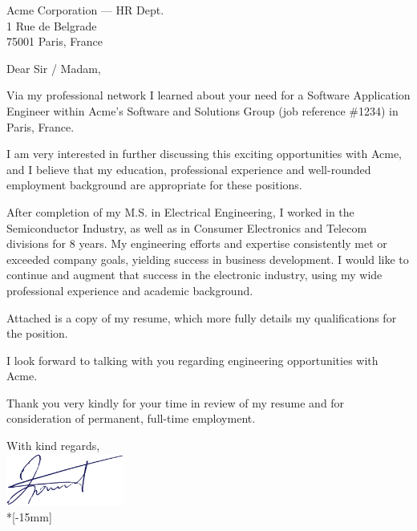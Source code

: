 \documentclass[standard]{scrlttr2}
\begin{document}
\begin{letter}{
   Acme Corporation --- HR Dept.\\
   1 Rue de Belgrade \\
   75001 Paris, France \\
}


\opening{Dear Sir / Madam,}
Via my professional network I learned about your need for a Software Application Engineer
within Acme's Software and Solutions Group (job reference \#1234) in Paris, France.

\bigskip
\noindent
I am very interested in further discussing this exciting opportunities with
Acme, and I believe that my education, professional experience and
well-rounded employment background are appropriate for these positions.

\bigskip
\noindent
After completion of my M.S. in Electrical Engineering, I worked in the
Semiconductor Industry, as well as in Consumer Electronics and Telecom divisions for
8 years. My engineering efforts and expertise consistently met or exceeded
company goals, yielding success in business development. I would like to continue
and augment that success in the electronic industry,
using my wide professional experience and academic background.

\bigskip
\noindent
Attached is a copy of my resume, which more fully details my
qualifications for the position.

\bigskip
\noindent
I look forward to talking with you regarding engineering opportunities with
Acme.

\bigskip
\noindent
Thank you very kindly for your time in review of my resume and for consideration
of permanent, full-time employment.

\closing{With kind regards,\\
   \includegraphics[height=17mm]{signature.eps}\\*[-15mm]
}

\end{letter}
\end{document}
